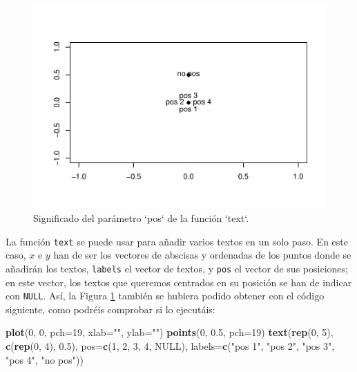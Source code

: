 \documentclass[
]{book}
\newenvironment{Shaded}{\begin{snugshade}}{\end{snugshade}}
\newcommand{\DataTypeTok}[1]{\textcolor[rgb]{0.13,0.29,0.53}{#1}}
\newcommand{\DecValTok}[1]{\textcolor[rgb]{0.00,0.00,0.81}{#1}}
\newcommand{\FloatTok}[1]{\textcolor[rgb]{0.00,0.00,0.81}{#1}}
\newcommand{\KeywordTok}[1]{\textcolor[rgb]{0.13,0.29,0.53}{\textbf{#1}}}
\newcommand{\NormalTok}[1]{#1}
\newcommand{\OtherTok}[1]{\textcolor[rgb]{0.56,0.35,0.01}{#1}}
\newcommand{\StringTok}[1]{\textcolor[rgb]{0.31,0.60,0.02}{#1}}
\theoremstyle{definition}
\theoremstyle{definition}
\theoremstyle{definition}
\theoremstyle{remark}
\begin{document}
\begin{figure}

{\centering \includegraphics[width=0.9\linewidth]{07chap06_Graficos_I_files/figure-latex/F10015-1} 

}

\caption{Significado del parámetro `pos` de la función `text`.}\label{fig:F10015}
\end{figure}

La función \texttt{text} se puede usar para añadir varios textos en un solo paso. En este caso, \(x\) e \(y\) han de ser los vectores de abscisas y ordenadas de los puntos donde se añadirán los textos, \texttt{labels} el vector de textos, y \texttt{pos} el vector de sus posiciones; en este vector, los textos que queremos centrados en su posición se han de indicar con \texttt{NULL}. Así, la Figura \ref{fig:F10015} también se hubiera podido obtener con el código siguiente, como podréis comprobar si lo ejecutáis:

\begin{Shaded}
\begin{Highlighting}[]
\KeywordTok{plot}\NormalTok{(}\DecValTok{0}\NormalTok{, }\DecValTok{0}\NormalTok{, }\DataTypeTok{pch=}\DecValTok{19}\NormalTok{, }\DataTypeTok{xlab=}\StringTok{""}\NormalTok{, }\DataTypeTok{ylab=}\StringTok{""}\NormalTok{)}
\KeywordTok{points}\NormalTok{(}\DecValTok{0}\NormalTok{, }\FloatTok{0.5}\NormalTok{, }\DataTypeTok{pch=}\DecValTok{19}\NormalTok{)}
\KeywordTok{text}\NormalTok{(}\KeywordTok{rep}\NormalTok{(}\DecValTok{0}\NormalTok{, }\DecValTok{5}\NormalTok{), }\KeywordTok{c}\NormalTok{(}\KeywordTok{rep}\NormalTok{(}\DecValTok{0}\NormalTok{, }\DecValTok{4}\NormalTok{), }\FloatTok{0.5}\NormalTok{), }\DataTypeTok{pos=}\KeywordTok{c}\NormalTok{(}\DecValTok{1}\NormalTok{, }\DecValTok{2}\NormalTok{, }\DecValTok{3}\NormalTok{, }\DecValTok{4}\NormalTok{, }\OtherTok{NULL}\NormalTok{), }
     \DataTypeTok{labels=}\KeywordTok{c}\NormalTok{(}\StringTok{"pos 1"}\NormalTok{, }\StringTok{"pos 2"}\NormalTok{, }\StringTok{"pos 3"}\NormalTok{, }\StringTok{"pos 4"}\NormalTok{, }\StringTok{"no pos"}\NormalTok{))}
\end{Highlighting}
\end{Shaded}
\end{document}
